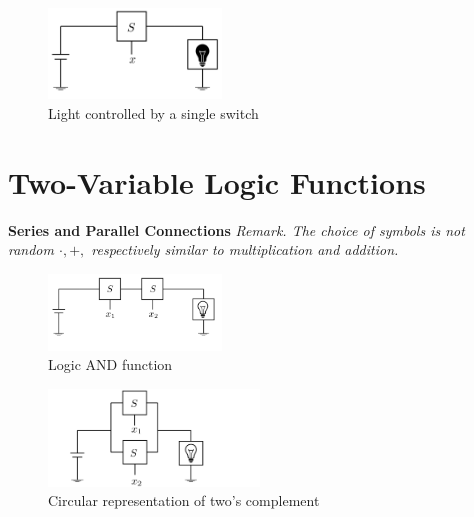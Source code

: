 \documentclass[12pt,openany, tikz,border=10pt]{book}
\begin{document}
\begin{figure}[htp] %
    \centering
    \includegraphics[width=0.41\textwidth]{circuits/6.1.2.png} %
    \caption*{Light controlled by a single switch}
  \end{figure}


\newpage
\section*{Two-Variable Logic Functions}
\textbf{Series and Parallel Connections}
\newline
\vspace{10px}
\textit{Remark. The choice of symbols is not random $\cdot, +,$ respectively similar to multiplication and addition.}
\vspace{20px}
\begin{figure}[htp] %
    \centering
    \includegraphics[width=0.41\textwidth]{circuits/6.1.3.png} %
    \caption*{Logic AND function}
  \end{figure}


 

\begin{figure}[htp] %
    \centering
    \includegraphics[width=0.5\textwidth]{circuits/6.1.3_2.png} %
    \caption*{Circular representation of two's complement}
  \end{figure}
\end{document}
